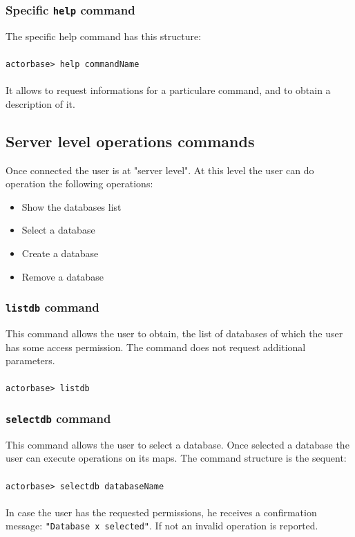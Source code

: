 \documentclass[a4paper]{article}
\begin{document}
	\subsubsection{Specific \texttt{help} command}
	The specific help command has this structure:
	\\ \\
	\texttt{actorbase>	help commandName}
	\\ \\
	It allows to request informations for a particulare command, and to obtain a description of it.
	
	\subsection{Server level operations commands}
	Once connected the user is at "server level". At this level the user can do operation the following operations:
	\begin{itemize}
		\item Show the databases list
		\item Select a database
		\item Create a database
		\item Remove a database
	\end{itemize}
	
	\subsubsection{\texttt{listdb} command}
	This command allows the user to obtain, the list of databases of which the user has some access permission. The command does not request additional parameters.
	\\ \\
	\texttt{actorbase>	listdb}

	\subsubsection{\texttt{selectdb} command}
	This command allows the user to select a database. Once selected a database the user can execute operations on its maps. The command structure is the sequent:
	\\ \\
	\texttt{actorbase>	selectdb databaseName}
	\\ \\
	In case the user has the requested permissions, he receives a confirmation message: \texttt{"Database x selected"}. If not an invalid operation is reported.
\end{document}
